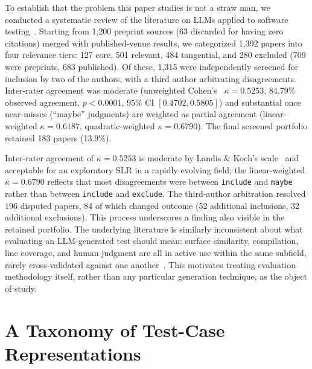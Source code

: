 \documentclass[conference]{IEEEtran}
\begin{document}
To establish that the problem this paper studies is not a straw man, we
conducted a systematic review of the literature on LLMs applied to software
testing~\cite{kitchenham2007guidelines}. Starting from 1{,}200 preprint sources (63 discarded for having zero
citations) merged with published-venue results, we categorized 1{,}392 papers
into four relevance tiers: 127 core, 501 relevant, 484 tangential, and 280
excluded (709 were preprints, 683 published). Of these, 1{,}315 were
independently screened for inclusion by two of the authors, with a third
author arbitrating disagreements. Inter-rater agreement was moderate
(unweighted Cohen's~\cite{cohen1960kappa} $\kappa=0.5253$, 84.79\% observed agreement, $p<0.0001$,
95\% CI $[0.4702, 0.5805]$) and substantial once near-misses (``maybe''
judgments) are weighted as partial agreement (linear-weighted
$\kappa=0.6187$, quadratic-weighted $\kappa=0.6790$). The final screened
portfolio retained 183 papers (13.9\%).

Inter-rater agreement of $\kappa=0.5253$ is moderate by Landis \& Koch's
scale~\cite{landis1977measurement} and acceptable for an exploratory SLR in a rapidly evolving field; the
linear-weighted $\kappa=0.6790$ reflects that most disagreements were between
\texttt{include} and \texttt{maybe} rather than between \texttt{include} and \texttt{exclude}.
The third-author arbitration resolved 196 disputed papers, 84 of which
changed outcome (52 additional inclusions, 32 additional exclusions). This
process underscores a finding also visible in the retained portfolio. The underlying literature is similarly inconsistent about what evaluating
an LLM-generated test should mean: surface similarity, compilation, line
coverage, and human judgment are all in active use within the same subfield,
rarely cross-validated against one another~\cite{yuan2023chatgpt,schafer2023empirical,siddiq2023empirical,wang2024testingsurvey}.
This motivates treating evaluation methodology itself, rather than any
particular generation technique, as the object of study.

\section{A Taxonomy of Test-Case Representations}
\label{sec:taxonomy}
\end{document}

